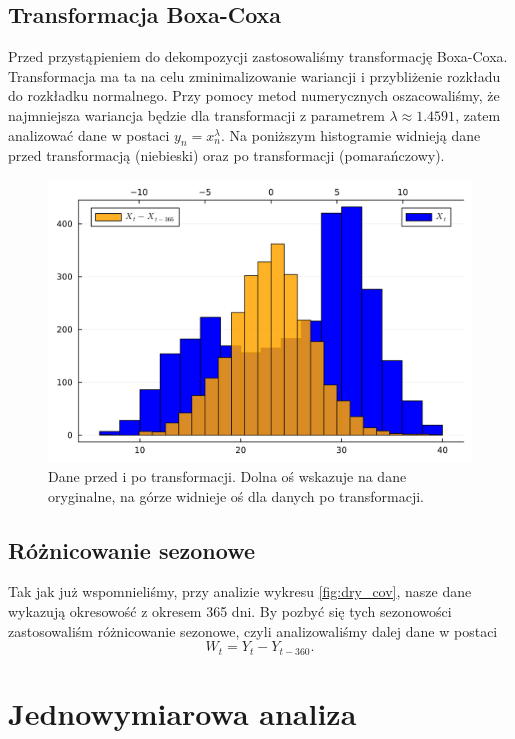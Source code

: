 \documentclass[12pt]{article}
\theoremstyle{exer}
\begin{document}
	\subsection{Transformacja Boxa-Coxa}
	Przed przystąpieniem do dekompozycji zastosowaliśmy transformację Boxa-Coxa. Transformacja ma ta na celu zminimalizowanie wariancji i przybliżenie rozkładu do rozkładku normalnego. Przy pomocy metod numerycznych oszacowaliśmy, że najmniejsza wariancja będzie dla transformacji z parametrem $\lambda\approx1.4591$, zatem analizować dane w postaci $y_n=x_n^\lambda$. Na poniższym histogramie widnieją dane przed transformacją (niebieski) oraz po transformacji (pomarańczowy).
	\begin{figure}[H]
		\includegraphics[width=\columnwidth]{Budnik/img/BoxCox.png}
		\caption{Dane przed i po transformacji. Dolna oś wskazuje na dane oryginalne, na górze widnieje oś dla danych po transformacji.}
	\end{figure}
	\subsection{Różnicowanie sezonowe}
	Tak jak już wspomnieliśmy, przy analizie wykresu \autoref{fig:dry_cov}, nasze dane wykazują okresowość z okresem 365 dni. By pozbyć się tych sezonowości zastosowaliśm różnicowanie sezonowe, czyli analizowaliśmy dalej dane w postaci
	\begin{equation}
		W_t=Y_t-Y_{t-360}.
	\end{equation}
	
	
	\section{Jednowymiarowa analiza}
\end{document}
